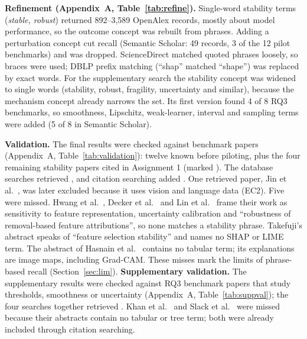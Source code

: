 \textbf{Refinement (Appendix~A, Table~\ref{tab:refine}).} Single-word stability terms (\textit{stable, robust}) returned 892--3,589 OpenAlex records, mostly about model performance, so the outcome concept was rebuilt from phrases. Adding a perturbation concept cut recall (Semantic Scholar: 49 records, 3 of the 12 pilot benchmarks) and was dropped. ScienceDirect matched quoted phrases loosely, so braces were used; DBLP prefix matching (``shap'' matched ``shape'') was replaced by exact words. For the supplementary search the stability concept was widened to single words (stability, robust, fragility, uncertainty and similar), because the mechanism concept already narrows the set. Its first version found 4 of 8 RQ3 benchmarks, so smoothness, Lipschitz, weak-learner, interval and sampling terms were added (5 of 8 in Semantic Scholar).

\textbf{Validation.} The final results were checked against \nKnown{} benchmark papers (Appendix~A, Table~\ref{tab:validation}): twelve known before piloting, plus the four remaining stability papers cited in Assignment 1 (marked \dag). The database searches retrieved \knownDb{}, and citation searching added \knownCs{}. One retrieved paper, Jin et al.\ \cite{jin2025}, was later excluded because it uses vision and language data (EC2). Five were missed. Hwang et al.\ \cite{hwang2025}, Decker et al.\ \cite{decker2025} and Lin et al.\ \cite{lin2023} frame their work as sensitivity to feature representation, uncertainty calibration and ``robustness of removal-based feature attributions'', so none matches a stability phrase. Takefuji's abstract \cite{takefuji2025} speaks of ``feature selection stability'' and names no SHAP or LIME term. The abstract of Hasnain et al.\ \cite{hasnain2026} contains no tabular term; its explanations are image maps, including Grad-CAM. These misses mark the limits of phrase-based recall (Section~\ref{sec:lim}).
\textbf{Supplementary validation.} The supplementary results were checked against \suppKnown{} RQ3 benchmark papers that study thresholds, smoothness or uncertainty (Appendix~A, Table~\ref{tab:suppval}); the four searches together retrieved \suppKnownFound. Khan et al.\ \cite{S23} and Slack et al.\ \cite{S05} were missed because their abstracts contain no tabular or tree term; both were already included through citation searching.

